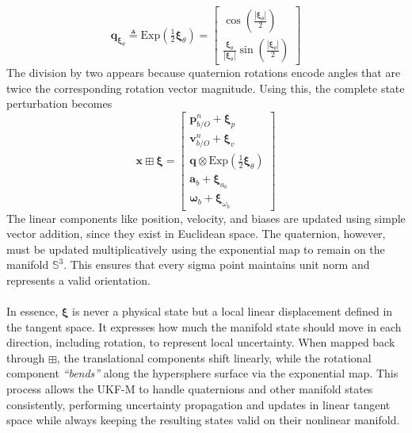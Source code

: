 $$
    \mathbf{q}_{\boldsymbol{\xi}_{\theta}} \triangleq 
    \mathrm{Exp}\left(\tfrac{1}{2}\boldsymbol{\xi}_{\theta}\right) =
    \begin{bmatrix}
        \cos\left(\tfrac{|\boldsymbol{\xi}_{\theta}|}{2}\right) \\
        \frac{\boldsymbol{\xi}_{\theta}}{|\boldsymbol{\xi}_{\theta}|}
        \sin\left(\tfrac{|\boldsymbol{\xi}_{\theta}|}{2}\right)
    \end{bmatrix}
$$
The division by two appears because quaternion rotations encode angles that are twice the corresponding rotation vector magnitude. Using this, the complete state perturbation becomes
$$
    \mathbf{x} \boxplus \boldsymbol{\xi} =
    \begin{bmatrix}
        \mathbf{p}_{b/O}^{n} + \boldsymbol{\xi}_{p} \\
        \mathbf{v}_{b/O}^{n} + \boldsymbol{\xi}_{v} \\
        \mathbf{q} \otimes \mathrm{Exp}\left(\tfrac{1}{2}\boldsymbol{\xi}_{\theta}\right) \\
        \mathbf{a}_b + \boldsymbol{\xi}_{a_b} \\
        \mathbf{\omega}_b + \boldsymbol{\xi}_{\omega_b}
    \end{bmatrix}
$$
The linear components like position, velocity, and biases are updated using simple vector addition, since they exist in Euclidean space. The quaternion, however, must be updated multiplicatively using the exponential map to remain on the manifold $\mathbb{S}^3$. This ensures that every sigma point maintains unit norm and represents a valid orientation.
\\ \\
In essence, $\boldsymbol{\xi}$ is never a physical state but a local linear displacement defined in the tangent space. It expresses how much the manifold state should move in each direction, including rotation, to represent local uncertainty. When mapped back through $\boxplus$, the translational components shift linearly, while the rotational component \textit{``bends''} along the hypersphere surface via the exponential map. This process allows the UKF-M to handle quaternions and other manifold states consistently, performing uncertainty propagation and updates in linear tangent space while always keeping the resulting states valid on their nonlinear manifold.

